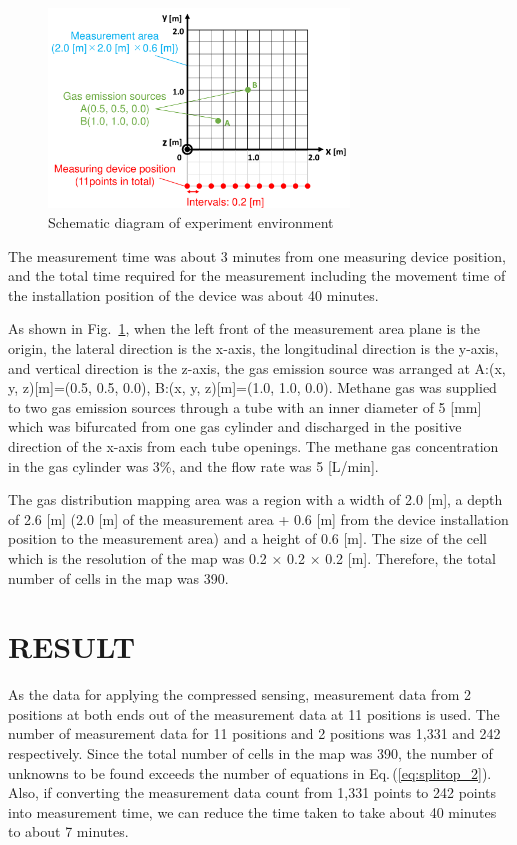\documentclass[fleqn,10pt,twocolumn]{SICE19}
\newcommand{\Figref}[1]{Fig.~\ref{#1}}
\newcommand{\Eqref}[1]{Eq.\,(\ref{#1})}
\begin{document}
\begin{figure}[h]
\begin{center}
\includegraphics[width=80mm]{env_image.pdf}
\caption{\label{fig:env_img} Schematic diagram of experiment environment}
\end{center}
\end{figure}

The measurement time was about 3 minutes from one measuring device position, and the total time required for the measurement including the movement time of the installation position of the device was about 40 minutes.

As shown in \Figref{fig:env_img}, when the left front of the measurement area plane is the origin, the lateral direction is the x-axis, the longitudinal direction is the y-axis, and vertical direction is the z-axis, the gas emission source was arranged at  A:(x, y, z)[m]=(0.5, 0.5, 0.0), B:(x, y, z)[m]=(1.0, 1.0, 0.0). Methane gas was supplied to two gas emission sources through a tube with an inner diameter of 5 [mm] which was bifurcated from one gas cylinder and discharged in the positive direction of the x-axis from each tube openings. The methane gas concentration in the gas cylinder was 3\%, and the flow rate was 5 [L/min].

The gas distribution mapping area was a region with a width of 2.0 [m], a depth of 2.6 [m] (2.0 [m] of the measurement area + 0.6 [m] from the device installation position to the measurement area) and a height of 0.6 [m]. The size of the cell which is the resolution of the map was 0.2 × 0.2 × 0.2 [m]. Therefore, the total number of cells in the map was 390.


\section{RESULT}\label{sec:res}
As the data for applying the compressed sensing, measurement data from 2 positions at both ends out of the measurement data at 11 positions is used. The number of measurement data for 11 positions and 2 positions was 1,331 and 242 respectively. Since the total number of cells in the map was 390, the number of unknowns to be found exceeds the number of equations in \Eqref{eq:splitop_2}. Also, if converting the measurement data count from 1,331 points to 242 points into measurement time, we can reduce the time taken to take about 40 minutes to about 7 minutes.
\end{document}
